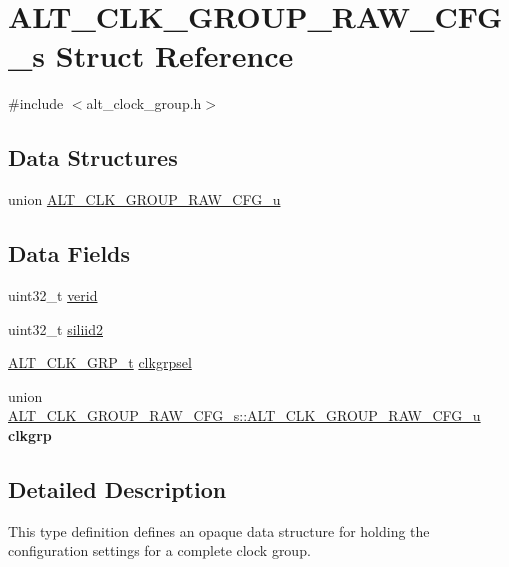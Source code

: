 \hypertarget{structALT__CLK__GROUP__RAW__CFG__s}{}\section{A\+L\+T\+\_\+\+C\+L\+K\+\_\+\+G\+R\+O\+U\+P\+\_\+\+R\+A\+W\+\_\+\+C\+F\+G\+\_\+s Struct Reference}
\label{structALT__CLK__GROUP__RAW__CFG__s}


{\ttfamily \#include $<$alt\+\_\+clock\+\_\+group.\+h$>$}

\subsection*{Data Structures}
\begin{DoxyCompactItemize}
\item 
union \mbox{\hyperlink{unionALT__CLK__GROUP__RAW__CFG__s_1_1ALT__CLK__GROUP__RAW__CFG__u}{A\+L\+T\+\_\+\+C\+L\+K\+\_\+\+G\+R\+O\+U\+P\+\_\+\+R\+A\+W\+\_\+\+C\+F\+G\+\_\+u}}
\end{DoxyCompactItemize}
\subsection*{Data Fields}
\begin{DoxyCompactItemize}
\item 
uint32\+\_\+t \mbox{\hyperlink{structALT__CLK__GROUP__RAW__CFG__s_ac85dda3c83196863d0c83aca2f6ff2fb}{verid}}
\item 
uint32\+\_\+t \mbox{\hyperlink{structALT__CLK__GROUP__RAW__CFG__s_aaa72aaa775be4dd6925078d5e819f712}{siliid2}}
\item 
\mbox{\hyperlink{alt__clock__group_8h_a077fbf1185c79377d6bdfe47a56713eb}{A\+L\+T\+\_\+\+C\+L\+K\+\_\+\+G\+R\+P\+\_\+t}} \mbox{\hyperlink{structALT__CLK__GROUP__RAW__CFG__s_a36d325064c461d62802b3bd81d112b15}{clkgrpsel}}
\item 
\mbox{\label{structALT__CLK__GROUP__RAW__CFG__s_abedeef1fd85cf92cb46f3432f971ce02}} 
union \mbox{\hyperlink{unionALT__CLK__GROUP__RAW__CFG__s_1_1ALT__CLK__GROUP__RAW__CFG__u}{A\+L\+T\+\_\+\+C\+L\+K\+\_\+\+G\+R\+O\+U\+P\+\_\+\+R\+A\+W\+\_\+\+C\+F\+G\+\_\+s\+::\+A\+L\+T\+\_\+\+C\+L\+K\+\_\+\+G\+R\+O\+U\+P\+\_\+\+R\+A\+W\+\_\+\+C\+F\+G\+\_\+u}} {\bfseries clkgrp}
\end{DoxyCompactItemize}


\subsection{Detailed Description}
This type definition defines an opaque data structure for holding the configuration settings for a complete clock group. 

